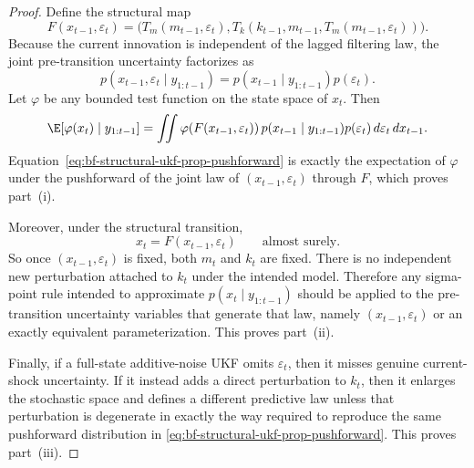 \begin{proof}
Define the structural map
\begin{equation}
  F(x_{t-1},\varepsilon_t)
  =
  \bigl(T_m(m_{t-1},\varepsilon_t),
  T_k(k_{t-1},m_{t-1},T_m(m_{t-1},\varepsilon_t))\bigr).
  \label{eq:bf-structural-ukf-prop-map}
\end{equation}
Because the current innovation is independent of the lagged filtering law, the
joint pre-transition uncertainty factorizes as
\begin{equation}
  p(x_{t-1},\varepsilon_t\mid y_{1:t-1})
  =
  p(x_{t-1}\mid y_{1:t-1})p(\varepsilon_t).
  \label{eq:bf-structural-ukf-prop-factorization}
\end{equation}
Let $\varphi$ be any bounded test function on the state space of $x_t$.  Then
\begin{equation}
  \E\!\left[\varphi(x_t)\mid y_{1:t-1}\right]
  =
  \iint
  \varphi\!\left(F(x_{t-1},\varepsilon_t)\right)
  p(x_{t-1}\mid y_{1:t-1})p(\varepsilon_t)
  \, d\varepsilon_t \, dx_{t-1}.
  \label{eq:bf-structural-ukf-prop-pushforward}
\end{equation}
Equation~\eqref{eq:bf-structural-ukf-prop-pushforward} is exactly the
expectation of $\varphi$ under the pushforward of the joint law of
$(x_{t-1},\varepsilon_t)$ through $F$, which proves part~(i).

Moreover, under the structural transition,
\begin{equation}
  x_t = F(x_{t-1},\varepsilon_t)
  \qquad \text{almost surely.}
  \label{eq:bf-structural-ukf-prop-deterministic-completion}
\end{equation}
So once $(x_{t-1},\varepsilon_t)$ is fixed, both $m_t$ and $k_t$ are fixed.
There is no independent new perturbation attached to $k_t$ under the intended
model.  Therefore any sigma-point rule intended to approximate
$p(x_t\mid y_{1:t-1})$ should be applied to the pre-transition uncertainty
variables that generate that law, namely $(x_{t-1},\varepsilon_t)$ or an
exactly equivalent parameterization.  This proves part~(ii).

Finally, if a full-state additive-noise UKF omits $\varepsilon_t$, then it
misses genuine current-shock uncertainty.  If it instead adds a direct
perturbation to $k_t$, then it enlarges the stochastic space and defines a
different predictive law unless that perturbation is degenerate in exactly the
way required to reproduce the same pushforward distribution in
\eqref{eq:bf-structural-ukf-prop-pushforward}.  This proves part~(iii).
\end{proof}

